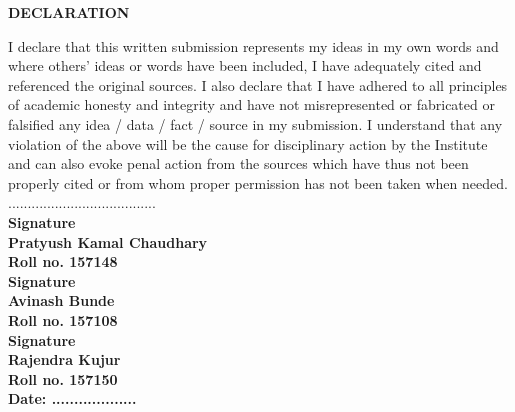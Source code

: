 \begin{center}
\vspace*{1.00cm}
{\large{\bf DECLARATION }}
\end{center}
{\normalsize
I declare that this written submission represents my ideas in my own words and where
others' ideas or words have been included, I have adequately cited and referenced the
original sources. I also declare that I have adhered to all principles of academic honesty
and integrity and have not misrepresented or fabricated or falsified any idea / data / fact
/ source in my submission. I understand that any violation of the above will be the cause
for disciplinary action by the Institute and can also evoke penal action from the sources
which have thus not been properly cited or from whom proper permission has not been
taken when needed.\\
\noindent
......................................\\
\vspace*{0.2cm}
\textbf{Signature}\\
\vspace*{0.2cm}
\textbf{Pratyush Kamal Chaudhary}\\
\vspace*{0.2cm}
\textbf{Roll no. 157148}\\
\vspace*{0.2cm}
\textbf{Signature}\\
\vspace*{0.2cm}
\textbf{Avinash Bunde}\\
\vspace*{0.2cm}
\textbf{Roll no. 157108}\\
\vspace*{0.2cm}
\textbf{Signature}\\
\vspace*{0.2cm}
\textbf{Rajendra Kujur}\\
\vspace*{0.5cm}
\textbf{Roll no. 157150}\\
\textbf{Date: ...................}\\
}
\newpage
